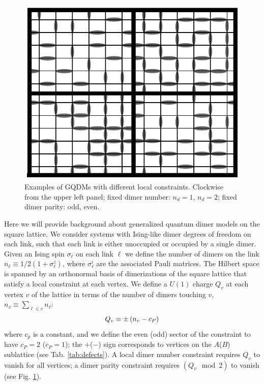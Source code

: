 \documentclass[twocolumn,prb,aps,floatfix,superscriptaddress]{revtex4-1}
\newcommand{\figref}[1]{Fig. \ref{#1}}
\newcommand{\tabref}[1]{Tab. \ref{#1}}
\begin{document}
\begin{figure}[htpb]
    \centering
    \includegraphics[width=0.9\linewidth]{example_local_constraints.pdf}
    \caption{Examples of GQDMs with different local constraints. Clockwise from the upper left panel; fixed dimer number: $n_d=1$, $n_d=2$;  fixed dimer parity: odd, even.}
    \label{fig:example_local_constraints}
\end{figure}
Here we will provide background about generalized quantum dimer models on the square lattice. We consider systems with Ising-like dimer degrees of freedom on each link, such that each link is either unoccupied or occupied by a single dimer. Given an Ising spin $\sigma_\ell$ on each link $\ell$ we define the number of dimers on the link $n_\ell \equiv 1/2(1+\sigma_\ell^z)$, where $\sigma_\ell^i$ are the associated Pauli matrices. The Hilbert space is spanned by an orthonormal basis of dimerizations of the square lattice that satisfy a local constraint at each vertex. We define a $U(1)$ charge $Q_v$ at each vertex $v$ of the lattice in terms of the number of dimers touching $v$, $n_v\equiv \sum_{\ell \in v}n_\ell$:
\begin{equation}
Q_v \equiv \pm \left( n_v - c_P \right) \notag
\end{equation}
where $c_p$ is a constant, and we define the even (odd) sector of the constraint to have $c_P = 2$ ($c_P=1$); the $+$($-$) sign corresponds to vertices on the $A$($B$) sublattice (see \tabref{tab:defects}). A local dimer number constraint requires $Q_v$ to vanish for all vertices; a dimer parity constraint requires $(Q_v\mod 2)$ to vanish (see \figref{fig:example_local_constraints}).
 
\end{document}
